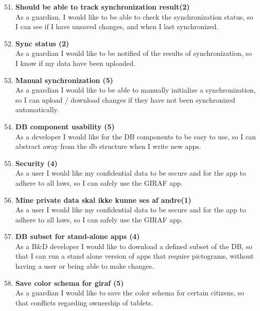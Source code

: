 \begin{enumerate}
	\setcounter{enumi}{50} %
	\item \textbf{Should be able to track synchronization result(2)}\\
	As a guardian, I would like to be able to check the synchronization status, so I can see if I have unsaved changes, and when I last synchronized.
	
	\item \textbf{Sync status (2)} \\
	As a guardian I would like to be notified of the results of synchronization, so I know if my data have been uploaded.
	
	\item \textbf{Manual synchronization (5)}\\
	As a guardian I would like to be able to manually initialize a synchronization, so I can upload / download changes if they have not been synchronized automatically. 
	
	\item \textbf{DB component usability (5)}\\
	As a developer I would like for the DB components to be easy to use, so I can abstract away from the db structure when I write new apps. 
	
	\item \textbf{Security (4)}\\
	As a user I would like my confidential data to be secure and for the app to adhere to all laws, so I can safely use the GIRAF app.
	
	\item \textbf{Mine private data skal ikke kunne ses af andre(1)}\\
	As a user I would like my confidential data to be secure and for the app to adhere to all laws, so I can safely use the GIRAF app. 
	
	\item \textbf{DB subset for stand-alone apps (4)}\\
	As a B\&D developer I would like to download a defined subset of the DB, so that I can run a stand alone version of apps that require pictograms, without having a user or being able to make changes.  
	
	\item \textbf{Save color schema for giraf (5)}\\
	As a guardian I would like to save the color schema for certain citizens, so that conflicts regarding ownership of tablets. 
	

\end{enumerate}

